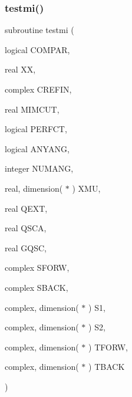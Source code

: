 \subsubsection{\texorpdfstring{testmi()}{testmi()}}
{\footnotesize\ttfamily subroutine testmi (\begin{DoxyParamCaption}\item[{logical}]{C\+O\+M\+P\+AR,  }\item[{real}]{XX,  }\item[{complex}]{C\+R\+E\+F\+IN,  }\item[{real}]{M\+I\+M\+C\+UT,  }\item[{logical}]{P\+E\+R\+F\+CT,  }\item[{logical}]{A\+N\+Y\+A\+NG,  }\item[{integer}]{N\+U\+M\+A\+NG,  }\item[{real, dimension( $\ast$ )}]{X\+MU,  }\item[{real}]{Q\+E\+XT,  }\item[{real}]{Q\+S\+CA,  }\item[{real}]{G\+Q\+SC,  }\item[{complex}]{S\+F\+O\+RW,  }\item[{complex}]{S\+B\+A\+CK,  }\item[{complex, dimension( $\ast$ )}]{S1,  }\item[{complex, dimension( $\ast$ )}]{S2,  }\item[{complex, dimension( $\ast$ )}]{T\+F\+O\+RW,  }\item[{complex, dimension( $\ast$ )}]{T\+B\+A\+CK }\end{DoxyParamCaption})}

